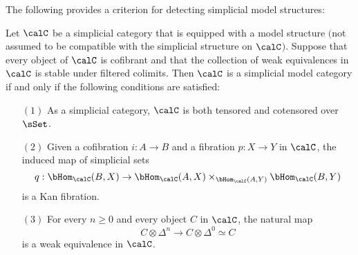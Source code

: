 The following provides a criterion for detecting simplicial model structures:

\begin{proposition}\label{testsimpmodel}
Let $\calC$ be a simplicial category that is equipped with a model structure $($not assumed to be compatible with the simplicial structure on $\calC$$)$. Suppose that every object of $\calC$ is cofibrant  and that the collection of weak equivalences in $\calC$ is stable under filtered colimits. Then $\calC$ is a simplicial model category if and only if the following conditions are satisfied:

\begin{itemize}
\item[$(1)$] As a simplicial category, $\calC$ is both tensored and cotensored over $\sSet$. 
\item[$(2)$] Given a cofibration $i: A \rightarrow B$ and a fibration $p: X \rightarrow Y$ in $\calC$, the induced map of simplicial sets
$$ q: \bHom_{\calC}(B, X) \rightarrow \bHom_{\calC}(A,X) \times_{ \bHom_{\calC}(A,Y)} \bHom_{\calC}(B,Y) $$
is a Kan fibration. 
\item[$(3)$] For every $n \geq 0$ and every object $C$ in $\calC$, the natural map
$$ C \otimes \Delta^n \rightarrow C \otimes \Delta^0 \simeq C$$
is a weak equivalence in $\calC$.
\end{itemize}
\end{proposition}

